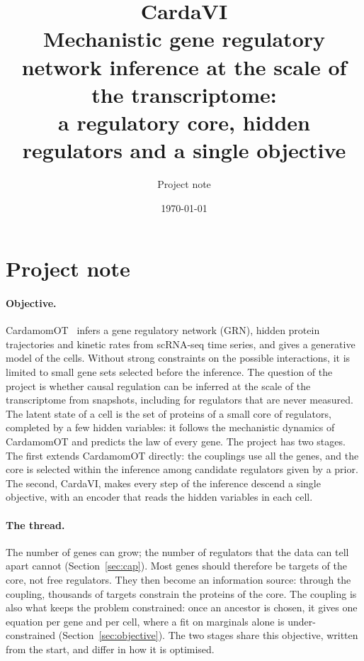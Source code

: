 \documentclass[a4paper, 11pt]{article}
\title{CardaVI\\[0.3em] \large Mechanistic gene regulatory network inference at the scale of the transcriptome:\\ a regulatory core, hidden regulators and a single objective}
\author{Project note}
\date{\today}
\theoremstyle{plain}
\theoremstyle{remark}
\begin{document}
\maketitle

\section*{Project note}

\paragraph{Objective.} CardamomOT~\cite{mauge2026cardamomot} infers a gene regulatory network (GRN), hidden protein trajectories and kinetic rates from scRNA-seq time series, and gives a generative model of the cells. Without strong constraints on the possible interactions, it is limited to small gene sets selected before the inference. The question of the project is whether causal regulation can be inferred at the scale of the transcriptome from snapshots, including for regulators that are never measured. The latent state of a cell is the set of proteins of a small core of regulators, completed by a few hidden variables: it follows the mechanistic dynamics of CardamomOT and predicts the law of every gene. The project has two stages. The first extends CardamomOT directly: the couplings use all the genes, and the core is selected within the inference among candidate regulators given by a prior. The second, CardaVI, makes every step of the inference descend a single objective, with an encoder that reads the hidden variables in each cell.

\paragraph{The thread.} The number of genes can grow; the number of regulators that the data can tell apart cannot (Section~\ref{sec:cap}). Most genes should therefore be targets of the core, not free regulators. They then become an information source: through the coupling, thousands of targets constrain the proteins of the core. The coupling is also what keeps the problem constrained: once an ancestor is chosen, it gives one equation per gene and per cell, where a fit on marginals alone is under-constrained (Section~\ref{sec:objective}). The two stages share this objective, written from the start, and differ in how it is optimised.
\end{document}
